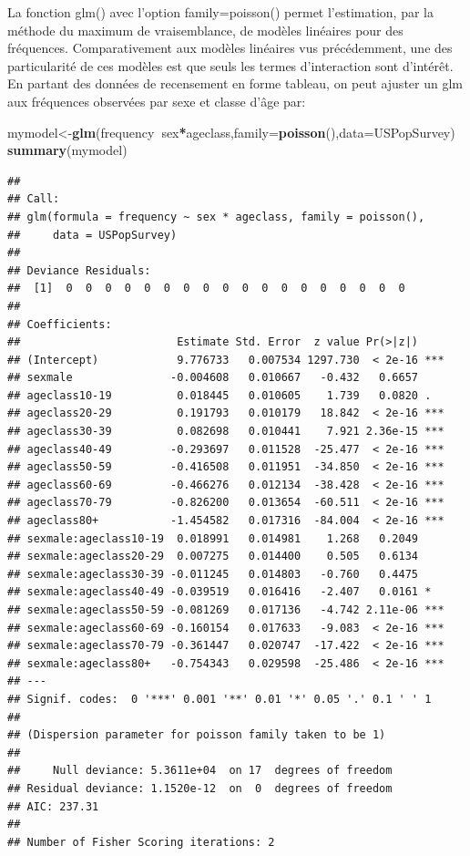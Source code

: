 \documentclass[12pt,]{book}
\newenvironment{Shaded}{\begin{snugshade}}{\end{snugshade}}
\newcommand{\DataTypeTok}[1]{\textcolor[rgb]{0.13,0.29,0.53}{#1}}
\newcommand{\KeywordTok}[1]{\textcolor[rgb]{0.13,0.29,0.53}{\textbf{#1}}}
\newcommand{\NormalTok}[1]{#1}
\newcommand{\OperatorTok}[1]{\textcolor[rgb]{0.81,0.36,0.00}{\textbf{#1}}}
\begin{document}
La fonction glm() avec l'option family=poisson() permet l'estimation, par la méthode du maximum de vraisemblance, de modèles linéaires pour des fréquences. Comparativement aux modèles linéaires vus précédemment, une des particularité de ces modèles est que seuls les termes d'interaction sont d'intérêt. En partant des données de recensement en forme tableau, on peut ajuster un glm aux fréquences observées par sexe et classe d'âge par:

\begin{Shaded}
\begin{Highlighting}[]
\NormalTok{mymodel<-}\KeywordTok{glm}\NormalTok{(frequency}\OperatorTok{~}\NormalTok{sex}\OperatorTok{*}\NormalTok{ageclass,}\DataTypeTok{family=}\KeywordTok{poisson}\NormalTok{(),}\DataTypeTok{data=}\NormalTok{USPopSurvey)}
\KeywordTok{summary}\NormalTok{(mymodel)}
\end{Highlighting}
\end{Shaded}

\begin{verbatim}
## 
## Call:
## glm(formula = frequency ~ sex * ageclass, family = poisson(), 
##     data = USPopSurvey)
## 
## Deviance Residuals: 
##  [1]  0  0  0  0  0  0  0  0  0  0  0  0  0  0  0  0  0  0
## 
## Coefficients:
##                        Estimate Std. Error  z value Pr(>|z|)    
## (Intercept)            9.776733   0.007534 1297.730  < 2e-16 ***
## sexmale               -0.004608   0.010667   -0.432   0.6657    
## ageclass10-19          0.018445   0.010605    1.739   0.0820 .  
## ageclass20-29          0.191793   0.010179   18.842  < 2e-16 ***
## ageclass30-39          0.082698   0.010441    7.921 2.36e-15 ***
## ageclass40-49         -0.293697   0.011528  -25.477  < 2e-16 ***
## ageclass50-59         -0.416508   0.011951  -34.850  < 2e-16 ***
## ageclass60-69         -0.466276   0.012134  -38.428  < 2e-16 ***
## ageclass70-79         -0.826200   0.013654  -60.511  < 2e-16 ***
## ageclass80+           -1.454582   0.017316  -84.004  < 2e-16 ***
## sexmale:ageclass10-19  0.018991   0.014981    1.268   0.2049    
## sexmale:ageclass20-29  0.007275   0.014400    0.505   0.6134    
## sexmale:ageclass30-39 -0.011245   0.014803   -0.760   0.4475    
## sexmale:ageclass40-49 -0.039519   0.016416   -2.407   0.0161 *  
## sexmale:ageclass50-59 -0.081269   0.017136   -4.742 2.11e-06 ***
## sexmale:ageclass60-69 -0.160154   0.017633   -9.083  < 2e-16 ***
## sexmale:ageclass70-79 -0.361447   0.020747  -17.422  < 2e-16 ***
## sexmale:ageclass80+   -0.754343   0.029598  -25.486  < 2e-16 ***
## ---
## Signif. codes:  0 '***' 0.001 '**' 0.01 '*' 0.05 '.' 0.1 ' ' 1
## 
## (Dispersion parameter for poisson family taken to be 1)
## 
##     Null deviance: 5.3611e+04  on 17  degrees of freedom
## Residual deviance: 1.1520e-12  on  0  degrees of freedom
## AIC: 237.31
## 
## Number of Fisher Scoring iterations: 2
\end{verbatim}
\end{document}
